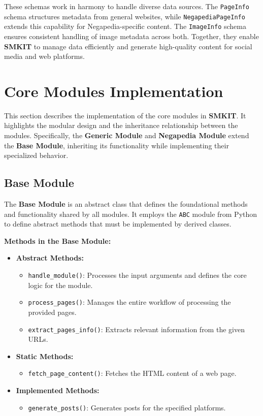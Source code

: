 These schemas work in harmony to handle diverse data sources. The \texttt{PageInfo} schema structures metadata from general websites, while \texttt{NegapediaPageInfo} extends this capability for Negapedia-specific content. The \texttt{ImageInfo} schema ensures consistent handling of image metadata across both. Together, they enable \textbf{SMKIT} to manage data efficiently and generate high-quality content for social media and web platforms.


\section{Core Modules Implementation}
\label{sec:core_modules_implementation}
This section describes the implementation of the core modules in \textbf{SMKIT}. It highlights the modular design and the inheritance relationship between the modules. Specifically, the \textbf{Generic Module} and \textbf{Negapedia Module} extend the \textbf{Base Module}, inheriting its functionality while implementing their specialized behavior.

\subsection{Base Module}
\label{subsec:base_module}
The \textbf{Base Module} is an abstract class that defines the foundational methods and functionality shared by all modules. It employs the \texttt{ABC} module from Python to define abstract methods that must be implemented by derived classes.

\textbf{Methods in the Base Module:}
\begin{itemize}
    \item \textbf{Abstract Methods:}
    \begin{itemize}
        \item \texttt{handle\_module()}: Processes the input arguments and defines the core logic for the module.
        \item \texttt{process\_pages()}: Manages the entire workflow of processing the provided pages.
        \item \texttt{extract\_pages\_info()}: Extracts relevant information from the given URLs.
    \end{itemize}
    \item \textbf{Static Methods:}
    \begin{itemize}
        \item \texttt{fetch\_page\_content()}: Fetches the HTML content of a web page.
    \end{itemize}
    \item \textbf{Implemented Methods:}
    \begin{itemize}
        \item \texttt{generate\_posts()}: Generates posts for the specified platforms.
    \end{itemize}
\end{itemize}

